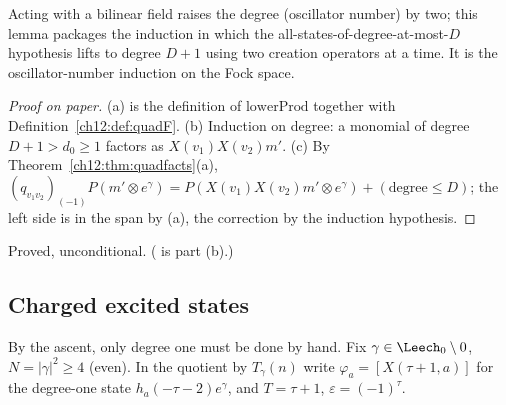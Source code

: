 \begin{physics}
Acting with a bilinear field raises the degree (oscillator number) by two; this lemma packages the induction in which the all-states-of-degree-at-most-$D$ hypothesis lifts to degree $D+1$ using two creation operators at a time. It is the oscillator-number induction on the Fock space.
\end{physics}
\begin{proof}[Proof on paper]
(a) is the definition of $\mathrm{lowerProd}$ together with Definition~\ref{ch12:def:quadF}.
(b) Induction on degree: a monomial of degree $D+1>d_0\ge1$ factors as $X(v_1)X(v_2)m'$.  (c) By
Theorem~\ref{ch12:thm:quadfacts}(a), $(q_{v_1v_2})_{(-1)}P(m'\otimes e^\gamma)=P(X(v_1)X(v_2)m'\otimes
e^\gamma)+(\text{degree}\le D)$; the left side is in the span by (a), the correction by the induction
hypothesis.
\end{proof}
\begin{status}Proved, unconditional.  ( is part (b).)\end{status}

\subsection{Charged excited states}

By the ascent, only degree one must be done by hand.  Fix $\gamma\in\Leech_0\setminus0$, $N=|\gamma|^2\ge4$
(even).  In the quotient by $T_\gamma(n)$ write $\varphi_a=[X(\tau+1,a)]$ for the degree-one state
$h_a(-\tau-2)e^\gamma$, and $T=\tau+1$, $\varepsilon=(-1)^\tau$.

